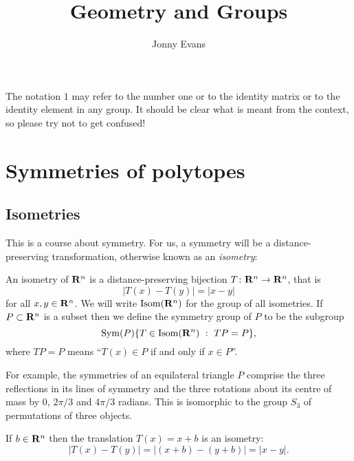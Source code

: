 \documentclass[12pt]{article}
\title{Geometry and Groups}
\author{Jonny Evans}
\begin{document}
\maketitle

The notation $1$ may refer to the number one or to the identity matrix or to the identity element in any group. It should be clear what is meant from the context, so please try not to get confused!

\section{Symmetries of polytopes}

\subsection{Isometries}

This is a course about symmetry. For us, a symmetry will be a distance-preserving transformation, otherwise known as an {\em isometry}:

\begin{dfn}
An isometry of $\mathbf{R}^n$ is a distance-preserving bijection $T\colon\mathbf{R}^n\to\mathbf{R}^n$, that is
\[|T(x)-T(y)|=|x-y|\]
for all $x,y\in\mathbf{R}^n$. We will write $\operatorname{Isom}(\mathbf{R}^n)$ for the group of all isometries. If $P\subset\mathbf{R}^n$ is a subset then we define the symmetry group of $P$ to be the subgroup
\[\OP{Sym}(P)\{T\in\OP{Isom}(\RR^n)\ :\ TP=P\},\]
where $TP=P$ means ``$T(x)\in P$ if and only if $x\in P$''.
\end{dfn}

\begin{exm}
For example, the symmetries of an equilateral triangle $P$ comprise the three reflections in its lines of symmetry and the three rotations about its centre of mass by $0$, $2\pi/3$ and $4\pi/3$ radians. This is isomorphic to the group $S_3$ of permutations of three objects.
\end{exm}

\begin{exm}
If $b\in\mathbf{R}^n$ then the translation $T(x)=x+b$ is an isometry:
\[|T(x)-T(y)|=|(x+b)-(y+b)|=|x-y|.\]
\end{exm}
\end{document}
